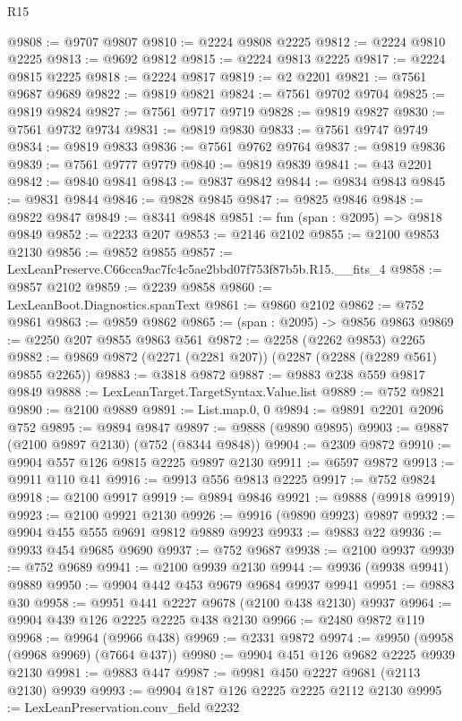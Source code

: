 \begin{lexlean}{R15}
\begin{coremodule}
@9808 := @9707 @9807
@9810 := @2224 @9808 @2225
@9812 := @2224 @9810 @2225
@9813 := @9692 @9812
@9815 := @2224 @9813 @2225
@9817 := @2224 @9815 @2225
@9818 := @2224 @9817
@9819 := @2 @2201
@9821 := @7561 @9687 @9689
@9822 := @9819 @9821
@9824 := @7561 @9702 @9704
@9825 := @9819 @9824
@9827 := @7561 @9717 @9719
@9828 := @9819 @9827
@9830 := @7561 @9732 @9734
@9831 := @9819 @9830
@9833 := @7561 @9747 @9749
@9834 := @9819 @9833
@9836 := @7561 @9762 @9764
@9837 := @9819 @9836
@9839 := @7561 @9777 @9779
@9840 := @9819 @9839
@9841 := @43 @2201
@9842 := @9840 @9841
@9843 := @9837 @9842
@9844 := @9834 @9843
@9845 := @9831 @9844
@9846 := @9828 @9845
@9847 := @9825 @9846
@9848 := @9822 @9847
@9849 := @8341 @9848
@9851 := fun (span : @2095) => @9818 @9849
@9852 := @2233 @207
@9853 := @2146 @2102
@9855 := @2100 @9853 @2130
@9856 := @9852 @9855
@9857 := LexLeanPreserve.C66cca9ac7fc4c5ae2bbd07f753f87b5b.R15.__fits_4
@9858 := @9857 @2102
@9859 := @2239 @9858
@9860 := LexLeanBoot.Diagnostics.spanText
@9861 := @9860 @2102
@9862 := @752 @9861
@9863 := @9859 @9862
@9865 := (span : @2095) -> @9856 @9863
@9869 := @2250 @207 @9855 @9863 @561
@9872 := @2258 (@2262 @9853) @2265
@9882 := @9869 @9872 (@2271 (@2281 @207)) (@2287 (@2288 (@2289 @561) @9855 @2265))
@9883 := @3818 @9872
@9887 := @9883 @238 @559 @9817 @9849
@9888 := LexLeanTarget.TargetSyntax.Value.list
@9889 := @752 @9821
@9890 := @2100 @9889
@9891 := List.map.{0, 0}
@9894 := @9891 @2201 @2096 @752
@9895 := @9894 @9847
@9897 := @9888 (@9890 @9895)
@9903 := @9887 (@2100 @9897 @2130) (@752 (@8344 @9848))
@9904 := @2309 @9872
@9910 := @9904 @557 @126 @9815 @2225 @9897 @2130
@9911 := @6597 @9872
@9913 := @9911 @110 @41
@9916 := @9913 @556 @9813 @2225
@9917 := @752 @9824
@9918 := @2100 @9917
@9919 := @9894 @9846
@9921 := @9888 (@9918 @9919)
@9923 := @2100 @9921 @2130
@9926 := @9916 (@9890 @9923) @9897
@9932 := @9904 @455 @555 @9691 @9812 @9889 @9923
@9933 := @9883 @22
@9936 := @9933 @454 @9685 @9690
@9937 := @752 @9687
@9938 := @2100 @9937
@9939 := @752 @9689
@9941 := @2100 @9939 @2130
@9944 := @9936 (@9938 @9941) @9889
@9950 := @9904 @442 @453 @9679 @9684 @9937 @9941
@9951 := @9883 @30
@9958 := @9951 @441 @2227 @9678 (@2100 @438 @2130) @9937
@9964 := @9904 @439 @126 @2225 @2225 @438 @2130
@9966 := @2480 @9872 @119
@9968 := @9964 (@9966 @438)
@9969 := @2331 @9872
@9974 := @9950 (@9958 (@9968 @9969) (@7664 @437))
@9980 := @9904 @451 @126 @9682 @2225 @9939 @2130
@9981 := @9883 @447
@9987 := @9981 @450 @2227 @9681 (@2113 @2130) @9939
@9993 := @9904 @187 @126 @2225 @2225 @2112 @2130
@9995 := LexLeanPreservation.conv_field @2232

\end{coremodule}
\end{lexlean}
